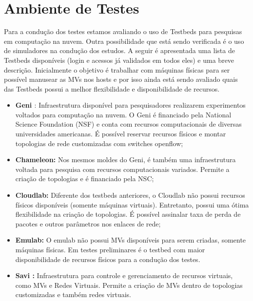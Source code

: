 \documentclass[10pt, conference, compsocconf]{IEEEtran}
\begin{document}
\section{Ambiente de Testes}
Para a condução dos testes estamos avaliando o uso de Testbeds para pesquisas em computação na nuvem. Outra possibilidade que está sendo verificada é o uso de simuladores na condução dos estudos. A seguir é apresentada uma lista de Testbeds disponíveis (login e acessos já validados em todos eles) e uma breve descrição. Inicialmente o objetivo é trabalhar com máquinas físicas para ser possível manusear as MVs nos hosts e por isso ainda está sendo avaliado quais das Testbeds possui a melhor flexibilidade e disponibilidade de recursos.

\begin{itemize}
 \item \textbf{Geni \cite{Elliott:2009}}: Infraestrutura disponível para pesquisadores realizarem experimentos voltados para computação na nuvem. O Geni é financiado pela National Science Foundation (NSF) e conta com recursos computacionais de diversas universidades americanas. É possível reservar recursos físicos e montar topologias de rede customizadas com switches openflow;
 \item \textbf{Chameleon:} Nos mesmos moldes do Geni, é também uma infraestrutura voltada para pesquisa com recursos computacionais variados. Permite a criação de topologias e é financiado pela NSC;
 \item \textbf{Cloudlab:} Diferente dos testbeds anteriores, o Cloudlab não possui recursos físicos disponíveis (somente máquinas virtuais). Entretanto, possui uma ótima flexibilidade na criação de topologias. É possível assinalar taxa de perda de pacotes e outros parâmetros nos enlaces de rede;
 \item \textbf{Emulab:} O emulab não possui MVs disponíveis para serem criadas, somente máquinas físicas. Em testes preliminares é o testbed com maior disponibilidade de recursos físicos para a condução dos testes.
  \item \textbf{Savi \cite{Joon:2013} :} Infraestrutura para controle e gerenciamento de recursos virtuais, como MVs e Redes Virtuais. Permite a criação de MVs dentro de topologias customizadas e também redes virtuais.
\end{itemize}
\end{document}
